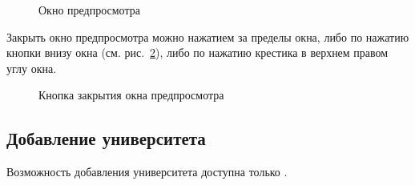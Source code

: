 		\begin{figure}[H]
		\caption{Окно предпросмотра}
		\label{university:edit_preview}
		\end{figure}	

Закрыть окно предпросмотра можно нажатием за пределы окна, либо по нажатию кнопки  внизу окна (см. рис.~\ref{university:preview_close_button}), либо по нажатию крестика в верхнем правом углу окна. 

		\begin{figure}[H]
			\caption{Кнопка закрытия окна предпросмотра}
			\label{university:preview_close_button}
		\end{figure}
		
\subsection{Добавление университета}
Возможность добавления университета доступна только . 

